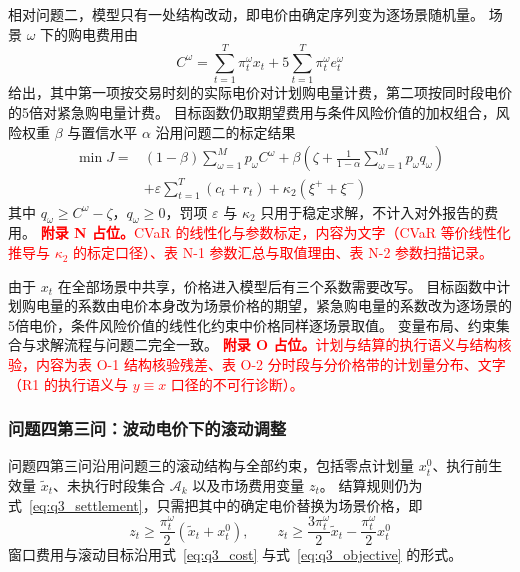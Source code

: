 相对问题二，模型只有一处结构改动，即电价由确定序列变为逐场景随机量。
场景 \(\omega\) 下的购电费用由
\begin{equation}
C^{\omega}
=
\sum_{t=1}^{T}\pi_t^{\omega}x_t
+
5\sum_{t=1}^{T}\pi_t^{\omega}e_t^{\omega}
\label{eq:q4_scenario_cost}
\end{equation}
给出，其中第一项按交易时刻的实际电价对计划购电量计费，第二项按同时段电价的5倍对紧急购电量计费。
目标函数仍取期望费用与条件风险价值的加权组合，风险权重 \(\beta\) 与置信水平 \(\alpha\) 沿用问题二的标定结果
\begin{equation}
\begin{aligned}
\min J={}&
(1-\beta)\sum_{\omega=1}^{M}p_{\omega}C^{\omega}
+
\beta\left(
\zeta+
\frac{1}{1-\alpha}
\sum_{\omega=1}^{M}p_{\omega}q_{\omega}
\right)\\
&+\varepsilon\sum_{t=1}^{T}(c_t+r_t)
+
\kappa_2(\xi^++\xi^-)
\end{aligned}
\label{eq:q4_objective}
\end{equation}
其中 \(q_{\omega}\geq C^{\omega}-\zeta\)，\(q_{\omega}\geq0\)，罚项 \(\varepsilon\) 与 \(\kappa_2\) 只用于稳定求解，不计入对外报告的费用。
\textcolor{red}{\textbf{附录 N 占位。}CVaR 的线性化与参数标定，内容为文字（CVaR 等价线性化推导与 \(\kappa_2\) 的标定口径）、表 N-1 参数汇总与取值理由、表 N-2 参数扫描记录。}

由于 \(x_t\) 在全部场景中共享，价格进入模型后有三个系数需要改写。
目标函数中计划购电量的系数由电价本身改为场景价格的期望，紧急购电量的系数改为逐场景的5倍电价，条件风险价值的线性化约束中价格同样逐场景取值。
变量布局、约束集合与求解流程与问题二完全一致。
\textcolor{red}{\textbf{附录 O 占位。}计划与结算的执行语义与结构核验，内容为表 O-1 结构核验残差、表 O-2 分时段与分价格带的计划量分布、文字（R1 的执行语义与 \(y\equiv x\) 口径的不可行诊断）。}

\subsubsection{问题四第三问：波动电价下的滚动调整}

问题四第三问沿用问题三的滚动结构与全部约束，包括零点计划量 \(x_t^0\)、执行前生效量 \(\widetilde{x}_t\)、未执行时段集合 \(\mathcal{A}_k\) 以及市场费用变量 \(z_t\)。
结算规则仍为式~\eqref{eq:q3_settlement}，只需把其中的确定电价替换为场景价格，即
\begin{equation}
z_t
\geq
\frac{\pi_t^{\omega}}{2}\left(\widetilde{x}_t+x_t^{0}\right),
\qquad
z_t
\geq
\frac{3\pi_t^{\omega}}{2}\widetilde{x}_t
-
\frac{\pi_t^{\omega}}{2}x_t^{0}
\label{eq:q4_adjust_settlement}
\end{equation}
窗口费用与滚动目标沿用式~\eqref{eq:q3_cost} 与式~\eqref{eq:q3_objective} 的形式。

